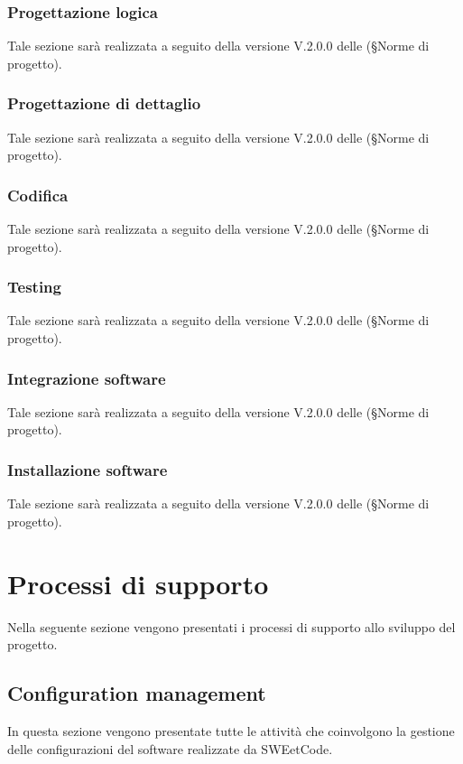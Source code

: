 \documentclass[10pt, a4paper]{article}
\begin{document}
\subsubsection{Progettazione logica}
Tale sezione sarà realizzata a seguito della versione V.2.0.0 delle (\S Norme di progetto).

\subsubsection{Progettazione di dettaglio}
Tale sezione sarà realizzata a seguito della versione V.2.0.0 delle (\S Norme di progetto).

\subsubsection{Codifica}
Tale sezione sarà realizzata a seguito della versione V.2.0.0 delle (\S Norme di progetto).

\subsubsection{Testing}
Tale sezione sarà realizzata a seguito della versione V.2.0.0 delle (\S Norme di progetto).

\subsubsection{Integrazione software}
Tale sezione sarà realizzata a seguito della versione V.2.0.0 delle (\S Norme di progetto).

\subsubsection{Installazione software}
Tale sezione sarà realizzata a seguito della versione V.2.0.0 delle (\S Norme di progetto).

\newpage

\section{Processi di supporto}
Nella seguente sezione vengono presentati i processi di supporto allo sviluppo del progetto.

\subsection{Configuration management}
In questa sezione vengono presentate tutte le attività che coinvolgono la gestione delle configurazioni del software realizzate da SWEetCode.
\end{document}
